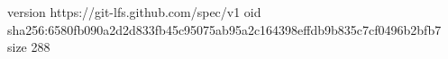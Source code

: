 version https://git-lfs.github.com/spec/v1
oid sha256:6580fb090a2d2d833fb45c95075ab95a2c164398effdb9b835c7cf0496b2bfb7
size 288
